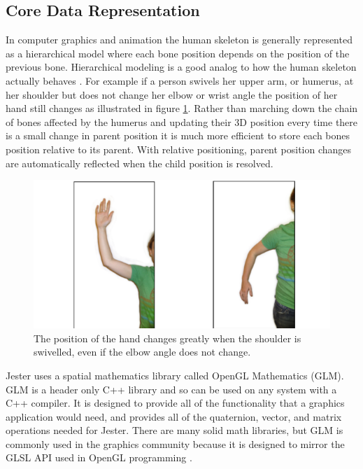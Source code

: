 \subsection{Core Data Representation}

In computer graphics and animation the human skeleton is generally represented as a hierarchical model where each bone position depends on the position of the previous bone. Hierarchical modeling is a good analog to how the human skeleton actually behaves \cite{parent2012computer}. For example if a person swivels her upper arm, or humerus, at her shoulder but does not change her elbow or wrist angle the position of her hand still changes as illustrated in figure \ref{fig:arm_swivel}. Rather than marching down the chain of bones affected by the humerus and updating their 3D position every time there is a small change in parent position it is much more efficient to store each bones position relative to its parent. With relative positioning, parent position changes are automatically reflected when the child position is resolved.

\begin{figure}[]
\centering
\includegraphics[width=1\textwidth]{figures/upDownSwivel}
\caption{The position of the hand changes greatly when the shoulder is swivelled, even if the elbow angle does not change.}
\label{fig:arm_swivel}
\end{figure}

Jester uses a spatial mathematics library called OpenGL Mathematics (GLM). GLM is a header only C++ library and so can be used on any system with a C++ compiler. It is designed to provide all of the functionality that a graphics application would need, and provides all of the quaternion, vector, and matrix operations needed for Jester. There are many solid math libraries, but GLM is commonly used in the graphics community because it is designed to mirror the GLSL API used in OpenGL programming \cite{glm}.

